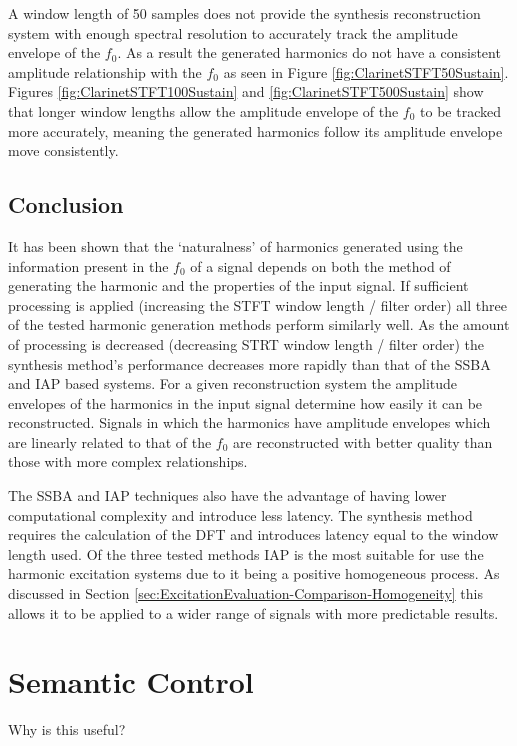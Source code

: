 		A window length of 50 samples does not provide the synthesis reconstruction system with enough spectral
		resolution to accurately track the amplitude envelope of the $f_{0}$. As a result the generated harmonics
		do not have a consistent amplitude relationship with the $f_{0}$ as seen in Figure
		\ref{fig:ClarinetSTFT50Sustain}. Figures \ref{fig:ClarinetSTFT100Sustain} and
		\ref{fig:ClarinetSTFT500Sustain} show that longer window lengths allow the amplitude envelope of the
		$f_{0}$ to be tracked more accurately, meaning the generated harmonics follow its amplitude envelope move
		consistently.
		
	\subsection{Conclusion}
	\label{sec:PerceptualExperiments-Reconstruction-Conclusion}
		It has been shown that the `naturalness' of harmonics generated using the information present in the
		$f_{0}$ of a signal depends on both the method of generating the harmonic and the properties of the input
		signal. If sufficient processing is applied (increasing the STFT window length / filter order) all three of
		the tested harmonic generation methods perform similarly well. As the amount of processing is decreased
		(decreasing STRT window length / filter order) the synthesis method's performance decreases more rapidly
		than that of the SSBA and IAP based systems. For a given reconstruction system the amplitude envelopes of
		the harmonics in the input signal determine how easily it can be reconstructed. Signals in which the
		harmonics have amplitude envelopes which are linearly related to that of the $f_{0}$ are reconstructed with
		better quality than those with more complex relationships.
		
		The SSBA and IAP techniques also have the advantage of having lower computational complexity and introduce
		less latency. The synthesis method requires the calculation of the DFT and introduces latency equal to the
		window length used. Of the three tested methods IAP is the most suitable for use the harmonic excitation
		systems due to it being a positive homogeneous process. As discussed in Section
		\ref{sec:ExcitationEvaluation-Comparison-Homogeneity} this allows it to be applied to a wider range of
		signals with more predictable results.

\section{Semantic Control}
\label{sec:PerceptualExperiments-SemanticControl}
	\note
	{
		Why is this useful?
	}


